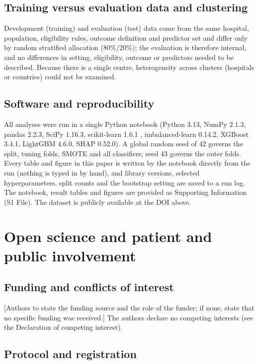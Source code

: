 \documentclass[a4paper,fleqn]{cas-dc}
\begin{document}
\subsection{Training versus evaluation data and clustering}
\label{sec:trev}

Development (training) and evaluation (test) data come from the same hospital, population, eligibility rules, outcome definition and predictor set and differ only by random stratified allocation (80\%/20\%); the evaluation is therefore internal, and no differences in setting, eligibility, outcome or predictors needed to be described. Because there is a single centre, heterogeneity across clusters (hospitals or countries) could not be examined.

\subsection{Software and reproducibility}
\label{sec:soft}

All analyses were run in a single Python notebook (Python 3.13, NumPy 2.1.3, pandas 2.2.3, SciPy 1.16.3, scikit-learn 1.6.1 \cite{r23}, imbalanced-learn 0.14.2, XGBoost 3.4.1, LightGBM 4.6.0, SHAP 0.52.0). A global random seed of 42 governs the split, tuning folds, SMOTE and all classifiers; seed 43 governs the outer folds. Every table and figure in this paper is written by the notebook directly from the run (nothing is typed in by hand), and library versions, selected hyperparameters, split counts and the bootstrap setting are saved to a run log. The notebook, result tables and figures are provided as Supporting Information (S1 File). The dataset is publicly available at the DOI above.

\section{Open science and patient and public involvement}
\label{sec:open}

\subsection{Funding and conflicts of interest}

[Authors to state the funding source and the role of the funder; if none, state that no specific funding was received.] The authors declare no competing interests (see the Declaration of competing interest).

\subsection{Protocol and registration}
\end{document}
